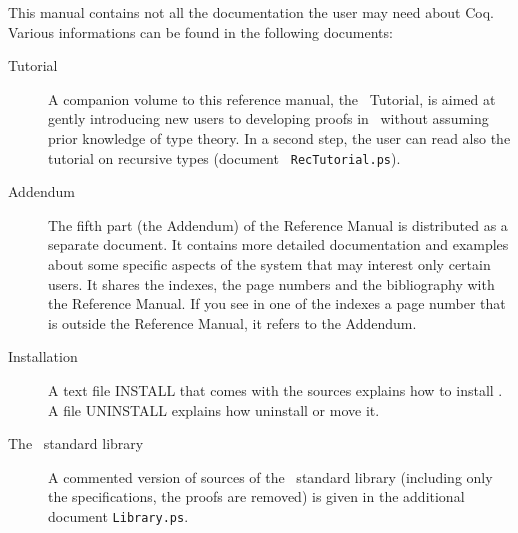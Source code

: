 This manual contains not all the documentation the user may need about
Coq. Various informations can be found in the following documents: 

\begin{description}

\item[Tutorial] 
  A companion volume to this reference manual, the \Coq\ Tutorial, is
  aimed at gently introducing new users to developing proofs in \Coq\
  without assuming prior knowledge of type theory. In a second step, the
  user can read also the tutorial on recursive types (document {\tt
    RecTutorial.ps}).

\item[Addendum] The fifth part (the Addendum) of the Reference Manual
  is distributed as a separate document. It contains more
  detailed documentation and examples about some specific aspects of the
  system that may interest only certain users. It shares the indexes,
  the page numbers and
  the bibliography with the Reference Manual. If you see in one of the
  indexes a page number that is outside the Reference Manual, it refers
  to the Addendum. 

\item[Installation] A text file INSTALL that comes with the sources
  explains how to install \Coq. A file UNINSTALL explains how
  uninstall or move it.

\item[The \Coq\ standard library]
A commented version of sources of the \Coq\ standard library
(including only the specifications, the proofs are removed) 
is given in the additional document {\tt Library.ps}.

\end{description}




